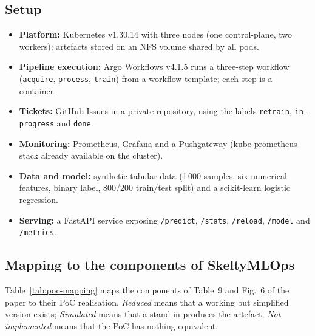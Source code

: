 \subsection{Setup}

\begin{itemize}
  \item \textbf{Platform:} Kubernetes v1.30.14 with three nodes (one control-plane, two workers); artefacts stored on an NFS volume shared by all pods.
  \item \textbf{Pipeline execution:} Argo Workflows v4.1.5 runs a three-step workflow (\texttt{acquire}, \texttt{process}, \texttt{train}) from a workflow template; each step is a container.
  \item \textbf{Tickets:} GitHub Issues in a private repository, using the labels \texttt{retrain}, \texttt{in-progress} and \texttt{done}.
  \item \textbf{Monitoring:} Prometheus, Grafana and a Pushgateway (kube-prometheus-stack already available on the cluster).
  \item \textbf{Data and model:} synthetic tabular data (1\,000 samples, six numerical features, binary label, 800/200 train/test split) and a scikit-learn logistic regression.
  \item \textbf{Serving:} a FastAPI service exposing \texttt{/predict}, \texttt{/stats}, \texttt{/reload}, \texttt{/model} and \texttt{/metrics}.
\end{itemize}

\subsection{Mapping to the components of SkeltyMLOps}

Table~\ref{tab:poc-mapping} maps the components of Table~9 and Fig.~6 of the paper to their PoC realisation. \emph{Reduced} means that a working but simplified version exists; \emph{Simulated} means that a stand-in produces the artefact; \emph{Not implemented} means that the PoC has nothing equivalent.

